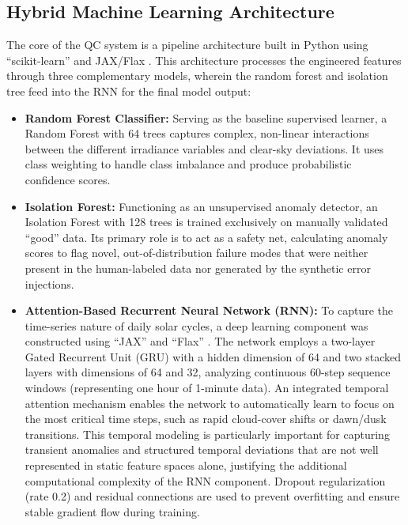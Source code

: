 \documentclass[12pt]{article}
\begin{document}
\subsection*{Hybrid Machine Learning Architecture}
The core of the QC system is a pipeline architecture built in Python using ``scikit-learn'' \cite{pedregosa2011scikit} and JAX/Flax \cite{jax2018github, flax2020github, deepmind2020jax}. This architecture processes the engineered features through three complementary models, wherein the random forest and isolation tree feed into the RNN for the final model output:

\begin{itemize}
    \item \textbf{Random Forest Classifier:} Serving as the baseline supervised learner, a Random Forest with 64 trees captures complex, non-linear interactions between the different irradiance variables and clear-sky deviations. It uses class weighting to handle class imbalance and produce probabilistic confidence scores.
    \item \textbf{Isolation Forest:} Functioning as an unsupervised anomaly detector, an Isolation Forest with 128 trees is trained exclusively on manually validated ``good'' data. Its primary role is to act as a safety net, calculating anomaly scores to flag novel, out-of-distribution failure modes that were neither present in the human-labeled data nor generated by the synthetic error injections.
    \item \textbf{Attention-Based Recurrent Neural Network (RNN):} To capture the time-series nature of daily solar cycles, a deep learning component was constructed using ``JAX'' and ``Flax'' \cite{jax2018github, flax2020github, deepmind2020jax}. The network employs a two-layer Gated Recurrent Unit (GRU) with a hidden dimension of 64 and two stacked layers with dimensions of 64 and 32, analyzing continuous 60-step sequence windows (representing one hour of 1-minute data). An integrated temporal attention mechanism enables the network to automatically learn to focus on the most critical time steps, such as rapid cloud-cover shifts or dawn/dusk transitions. This temporal modeling is particularly important for capturing transient anomalies and structured temporal deviations that are not well represented in static feature spaces alone, justifying the additional computational complexity of the RNN component. Dropout regularization (rate 0.2) and residual connections are used to prevent overfitting and ensure stable gradient flow during training.
\end{itemize}
\end{document}
